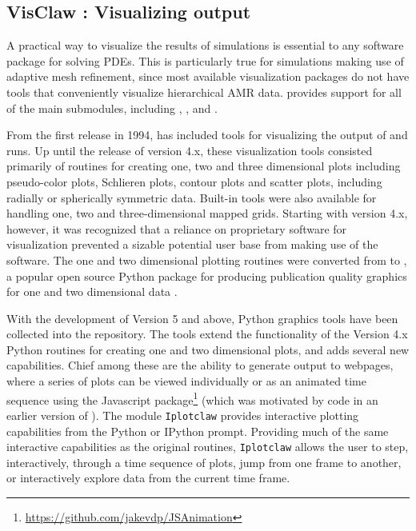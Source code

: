 %
%
%

\subsection{VisClaw : Visualizing \clawpack output}
A practical way to visualize the results of simulations is
essential to any software package for solving PDEs.
This is particularly true for simulations making use of adaptive mesh
refinement, since most available visualization packages do not
have tools that conveniently visualize hierarchical AMR data.  \visclaw provides 
support for all of the main \clawpack submodules, including
\classic, \amrclaw, \pyclaw and \geoclaw.

From the first release in 1994,
\clawpack has included tools for visualizing the output of \clawpack and
\amrclaw runs.  Up until the release of version \clawpack 4.x, these
visualization tools consisted primarily of \mlab routines
for creating one, two and three dimensional plots including
pseudo-color plots, Schlieren plots, contour plots and scatter plots,
including  radially or spherically symmetric data. 
Built-in tools were also available
for handling one, two and three-dimensional mapped grids.
Starting with version 4.x, however, it was recognized that a reliance
on proprietary software for visualization prevented a sizable
potential user base from making use of the \clawpack software.
The one and two dimensional plotting
routines were converted from \mlab to \mplotlib,
a popular open source
Python package for producing publication quality graphics
for one and two dimensional data \cite{Hunter:2007}.

With the development of \clawpack Version 5 and above, Python graphics tools
have been collected into the \visclaw repository.
The \visclaw tools extend the
functionality of the Version 4.x Python routines for creating one and
two dimensional plots, and adds several new capabilities.  Chief among
these are the ability to generate output to webpages,
where a series of plots can be viewed individually or as an animated
time sequence using the Javascript 
package\footnote{\url{https://github.com/jakevdp/JSAnimation}}
(which was motivated by code in an earlier version of \clawpack).
The \visclaw module {\tt Iplotclaw} provides
interactive plotting capabilities from the Python or IPython prompt.
Providing much of the same interactive capabilities as the original
\mlab routines, {\tt Iplotclaw} allows the user to step,
interactively, through a time sequence of plots, jump from one frame
to another, or interactively explore data from the current time frame.

